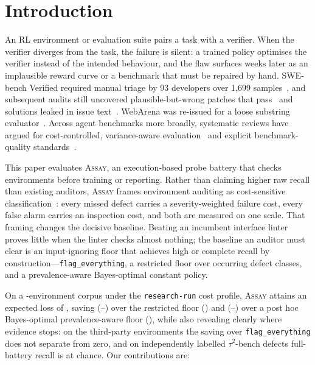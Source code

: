 \documentclass[11pt]{article}
\newcommand{\assay}{\textsc{Assay}}
\newcommand{\fe}{\texttt{flag\_everything}}
\begin{document}
\section{Introduction}
\label{sec:intro}

An RL environment or evaluation suite pairs a task with a verifier. When the verifier diverges from
the task, the failure is silent: a trained policy optimises the verifier instead of the intended
behaviour, and the flaw surfaces weeks later as an implausible reward curve or a benchmark that must
be repaired by hand. SWE-bench Verified required manual triage by 93 developers over 1,699
samples~\citep{openai2024verified}, and subsequent audits still uncovered plausible-but-wrong
patches that pass~\citep{wang2025solved} and solutions leaked in issue
text~\citep{aleithan2024swebenchplus}. WebArena was re-issued for a loose substring
evaluator~\citep{elhattami2025webarenaverified}. Across agent benchmarks more broadly, systematic
reviews have argued for cost-controlled, variance-aware evaluation~\citep{kapoor2024agents} and
explicit benchmark-quality standards~\citep{reuel2024betterbench}.

This paper evaluates \assay{}, an execution-based probe battery that checks environments before
training or reporting. Rather than claiming higher raw recall than existing auditors, \assay{}
frames environment auditing as cost-sensitive classification~\citep{elkan2001}: every missed defect
carries a severity-weighted failure cost, every false alarm carries an inspection cost, and both
are measured on one scale. That framing changes the decisive baseline. Beating an incumbent
interface linter proves little when the linter checks almost nothing; the baseline an auditor must
clear is an input-ignoring floor that achieves high or complete recall by construction---\fe{}, a
restricted floor over occurring defect classes, and a prevalence-aware Bayes-optimal constant
policy.

On a \nEnv{}-environment corpus under the \texttt{research-run} cost profile, \assay{} attains an
expected loss of \lossAssay{}, saving \savedRestricted{} (\loSavedRestricted--\hiSavedRestricted{})
over the restricted floor (\floorRestricted{}) and \savedPrevResearch{}
(\loSavedPrevResearch--\hiSavedPrevResearch{}) over a post hoc Bayes-optimal prevalence-aware floor
(\lossPrevResearch{}), while also revealing clearly where evidence stops: on the \nExternal{}
third-party environments the saving over \fe{} does not separate from zero, and on independently
labelled $\tau^2$-bench defects full-battery recall is at chance. Our contributions are:
\end{document}
